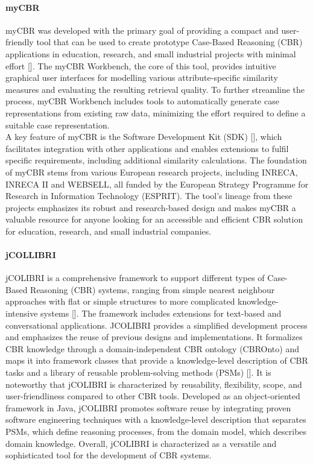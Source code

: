             \paragraph{myCBR}
            myCBR was developed with the primary goal of providing a compact and user-friendly tool that can be used to create prototype Case-Based Reasoning (CBR) applications in education, research, and small industrial projects with minimal effort []. The myCBR Workbench, the core of this tool, provides intuitive graphical user interfaces for modelling various attribute-specific similarity measures and evaluating the resulting retrieval quality. To further streamline the process, myCBR Workbench includes tools to automatically generate case representations from existing raw data, minimizing the effort required to define a suitable case representation.\\
            A key feature of myCBR is the Software Development Kit (SDK) [], which facilitates integration with other applications and enables extensions to fulfil specific requirements, including additional similarity calculations. The foundation of myCBR stems from various European research projects, including INRECA, INRECA II and WEBSELL, all funded by the European Strategy Programme for Research in Information Technology (ESPRIT). The tool's lineage from these projects emphasizes its robust and research-based design and makes myCBR a valuable resource for anyone looking for an accessible and efficient CBR solution for education, research, and small industrial companies.

        
            \paragraph{jCOLLIBRI}
            jCOLIBRI is a comprehensive framework to support different types of Case-Based Reasoning (CBR) systems, ranging from simple nearest neighbour approaches with flat or simple structures to more complicated knowledge-intensive systems []. The framework includes extensions for text-based and conversational applications. JCOLIBRI provides a simplified development process and emphasizes the reuse of previous designs and implementations. It formalizes CBR knowledge through a domain-independent CBR ontology (CBROnto) and maps it into framework classes that provide a knowledge-level description of CBR tasks and a library of reusable problem-solving methods (PSMs) []. It is noteworthy that jCOLIBRI is characterized by reusability, flexibility, scope, and user-friendliness compared to other CBR tools. Developed as an object-oriented framework in Java, jCOLIBRI promotes software reuse by integrating proven software engineering techniques with a knowledge-level description that separates PSMs, which define reasoning processes, from the domain model, which describes domain knowledge. Overall, jCOLIBRI is characterized as a versatile and sophisticated tool for the development of CBR systems.

